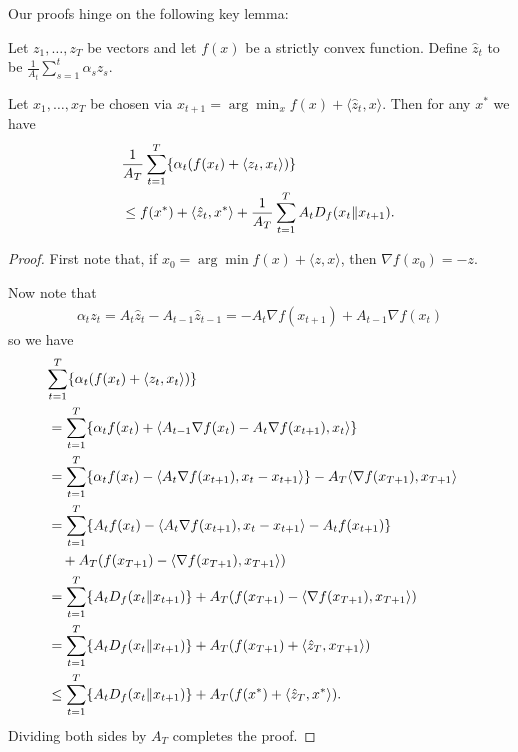 \documentclass{article}
\begin{document}
Our proofs hinge on the following key lemma:
\begin{lemma}
\label{lem:bregman}
Let $z_1,\ldots,z_T$ be vectors and let $f(x)$ be a strictly convex 
function. Define $\hat{z}_t$ to be $\frac{1}{A_t} \sum_{s=1}^t \alpha_s z_s$.

Let $x_1,\ldots,x_T$ be chosen via $x_{t+1} = \arg\min_{x} f(x) + \langle \hat{z}_t, x\rangle$. 
Then for any $x^*$ we have
\begin{align*}
\lefteqn{\frac{1}{A_T} \sum_{t=1}^T \{\alpha_t(f(x_t) + \langle z_t, x_t \rangle)\}} \\
\phantom{+} &\leq f(x^*) + \langle \hat{z}_t, x^* \rangle + \frac{1}{A_T} \sum_{t=1}^T A_t D_{f}(x_t \| x_{t+1}). 
\end{align*}
\end{lemma}
\begin{proof}
First note that, if $x_0 = \arg\min f(x) + \langle z, x \rangle$, 
then $\nabla f(x_0) = -z$.


Now note that
\begin{align}
\alpha_{t}z_{t} = A_{t}\hat z_{t} - A_{t-1}\hat z_{t-1} = - A_{t}\nabla f(x_{t+1}) + A_{t-1} \nabla f(x_{t}) 
\end{align}
so we have
\begin{align}
\lefteqn{\sum_{t=1}^T \{\alpha_t(f(x_t) + \langle z_t, x_t \rangle)\}} \\
 &= \sum_{t=1}^T \{\alpha_t f(x_t) + \langle A_{t-1} \nabla f(x_t) - A_t \nabla f(x_{t+1}), x_t \rangle\} \\
 &= \sum_{t=1}^T \{\alpha_t f(x_t) - \langle A_{t} \nabla f(x_{t+1}), x_t-x_{t+1} \rangle\} - A_{T}\langle \nabla f(x_{T+1}), x_{T+1} \rangle \\
 &= \sum_{t=1}^T \{A_t f(x_t) - \langle A_{t} \nabla f(x_{t+1}), x_t-x_{t+1} \rangle - A_t f(x_{t+1})\}  \\
 &\quad+ A_T(f(x_{T+1}) - \langle \nabla f(x_{T+1}), x_{T+1} \rangle) \nonumber \\
 &= \sum_{t=1}^T \{A_tD_f(x_t \| x_{t+1})\} + A_T(f(x_{T+1}) - \langle \nabla f(x_{T+1}), x_{T+1} \rangle) \\
 &= \sum_{t=1}^T \{A_tD_f(x_t \| x_{t+1})\} + A_T(f(x_{T+1}) + \langle \hat{z}_T, x_{T+1} \rangle) \\
 &\leq \sum_{t=1}^T \{A_tD_f(x_t \| x_{t+1})\} + A_T(f(x^*) + \langle \hat{z}_T, x^* \rangle). \\
\end{align}
Dividing both sides by $A_T$ completes the proof.
\end{proof}
\end{document}
